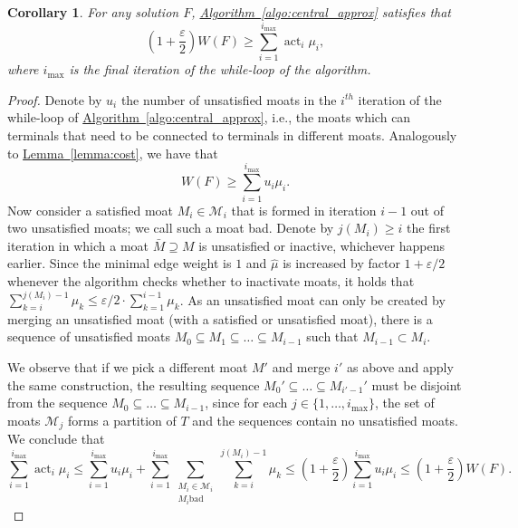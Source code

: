 \documentclass[letterpaper,11pt]{article}
\newtheorem{corollary}[theorem]{Corollary}
\newcommand{\namedref}[2]{\hyperref[#2]{#1~\ref*{#2}}}
\newcommand{\lemmaref}[1]{\namedref{Lemma}{#1}}
\newcommand{\algref}[1]{\namedref{Algorithm}{#1}}
\newcommand{\M}{\mathcal{M}}
\DeclareMathOperator{\act}{act}
\begin{document}
\begin{corollary}\label{coro:cost_approx}
For any solution $F$, \algref{algo:central_approx} satisfies that
\begin{equation*}
\left(1+\frac{\varepsilon}{2}\right)W(F)\geq \sum_{i=1}^{i_{\max}}\act_i\mu_i,
\end{equation*}
where $i_{\max}$ is the final iteration of the while-loop of the algorithm.
\end{corollary}
\begin{proof}
Denote by $u_i$ the number of unsatisfied moats in the $i^{th}$ iteration of the
while-loop of \algref{algo:central_approx}, i.e., the moats which can terminals
that need to be connected to terminals in different moats. Analogously to
\lemmaref{lemma:cost}, we have that
\begin{equation*}
W(F)\geq \sum_{i=1}^{i_{\max}}u_i\mu_i.
\end{equation*}
Now consider a satisfied moat $M_i\in \M_i$ that is formed in iteration $i-1$
out of two unsatisfied moats; we call such a moat bad. Denote by $j(M_i)\geq i$
the first iteration in which a moat $\bar{M}\supseteq M$ is unsatisfied or
inactive, whichever happens earlier. Since the minimal edge weight is $1$ and
$\hat{\mu}$ is increased by factor $1+\varepsilon/2$ whenever the algorithm
checks whether to inactivate moats, it holds that $\sum_{k=i}^{j(M_i)-1}
\mu_k\leq \varepsilon/2\cdot \sum_{k=1}^{i-1} \mu_k$. As an unsatisfied moat
can only be created by merging an unsatisfied moat (with a satisfied or
unsatisfied moat), there is a sequence of unsatisfied moats $M_0\subseteq
M_1\subseteq\ldots\subseteq M_{i-1}$ such that $M_{i-1}\subset M_i$.

We observe that if we pick a different moat $M'$ and merge $i'$ as above and
apply the same construction, the resulting sequence
$M_0'\subseteq\ldots\subseteq M_{i'-1}'$ must be disjoint from the sequence
$M_0\subseteq\ldots\subseteq M_{i-1}$, since for each $j\in
\{1,\ldots,i_{\max}\}$, the set of moats $\M_j$ forms a partition of $T$ and
the sequences contain no unsatisfied moats. We conclude that
\begin{equation*}
\sum_{i=1}^{i_{\max}}\act_i\mu_i \leq \sum_{i=1}^{i_{\max}}u_i\mu_i
+ \sum_{i=1}^{i_{\max}}\sum_{\substack{M_i\in \M_i\\ M_i \mbox{
bad}}}\sum_{k=i}^{j(M_i)-1}\mu_k
\leq \left(1+\frac{\varepsilon}{2}\right)\sum_{i=1}^{i_{\max}}u_i\mu_i
\leq \left(1+\frac{\varepsilon}{2}\right)W(F).
\end{equation*}
\end{proof}
\end{document}

